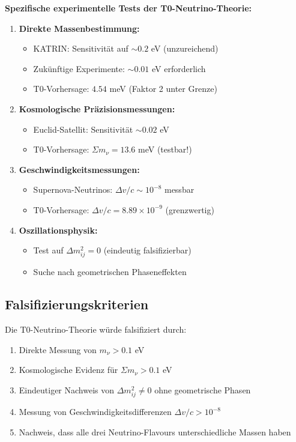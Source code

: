 \documentclass[12pt,a4paper]{article}
\begin{document}
	\begin{experimental}
		\textbf{Spezifische experimentelle Tests der T0-Neutrino-Theorie:}
		
		\begin{enumerate}
			\item \textbf{Direkte Massenbestimmung:}
			\begin{itemize}
				\item KATRIN: Sensitivität auf $\sim 0.2$ eV (unzureichend)
				\item Zukünftige Experimente: $\sim 0.01$ eV erforderlich
				\item T0-Vorhersage: $4.54$ meV (Faktor 2 unter Grenze)
			\end{itemize}
			
			\item \textbf{Kosmologische Präzisionsmessungen:}
			\begin{itemize}
				\item Euclid-Satellit: Sensitivität $\sim 0.02$ eV
				\item T0-Vorhersage: $\Sigma m_\nu = 13.6$ meV (testbar!)
			\end{itemize}
			
			\item \textbf{Geschwindigkeitsmessungen:}
			\begin{itemize}
				\item Supernova-Neutrinos: $\Delta v/c \sim 10^{-8}$ messbar
				\item T0-Vorhersage: $\Delta v/c = 8.89 \times 10^{-9}$ (grenzwertig)
			\end{itemize}
			
			\item \textbf{Oszillationsphysik:}
			\begin{itemize}
				\item Test auf $\Delta m^2_{ij} = 0$ (eindeutig falsifizierbar)
				\item Suche nach geometrischen Phaseneffekten
			\end{itemize}
		\end{enumerate}
	\end{experimental}
	
	\subsection{Falsifizierungskriterien}
	
	Die T0-Neutrino-Theorie würde falsifiziert durch:
	\begin{enumerate}
		\item Direkte Messung von $m_\nu > 0.1$ eV
		\item Kosmologische Evidenz für $\Sigma m_\nu > 0.1$ eV
		\item Eindeutiger Nachweis von $\Delta m^2_{ij} \neq 0$ ohne geometrische Phasen
		\item Messung von Geschwindigkeitsdifferenzen $\Delta v/c > 10^{-8}$
		\item Nachweis, dass alle drei Neutrino-Flavours unterschiedliche Massen haben
	\end{enumerate}
	
\end{document}
